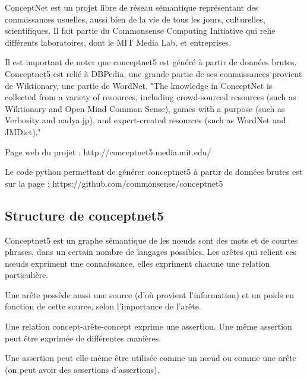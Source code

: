 \documentclass[a4paper,12pt]{article}
\begin{document}
ConceptNet est un projet libre de réseau sémantique représentant des connaissances usuelles, aussi bien de la vie de tous les jours, culturelles, scientifiques. Il fait partie du Commonsense Computing Initiative qui relie différents laboratoires, dont le MIT Media Lab, et entreprises.

Il est important de noter que conceptnet5 est généré à partir de données brutes. Conceptnet5 est relié à DBPedia, une grande partie de ses connaissances provient de Wiktionary, une partie de WordNet.
"The knowledge in ConceptNet is collected from a variety of resources, including crowd-sourced resources (such as Wiktionary and Open Mind Common Sense), games with a purpose (such as Verbosity and nadya.jp), and expert-created resources (such as WordNet and JMDict)."

Page web du projet :
http://conceptnet5.media.mit.edu/

Le code python permettant de générer conceptnet5 à partir de données brutes est sur la page :
https://github.com/commonsense/conceptnet5

\subsection{Structure de conceptnet5}

Conceptnet5 est un graphe sémantique de 
les n\oe uds sont des mots et de courtes phrases, dans un certain nombre de langages possibles. Les arêtes qui relient ces n\oe uds expriment une connaissance, elles expriment chacune une relation particulière.

Une arête possède aussi une source (d'où provient l'information) et un poids en fonction de cette source, selon l'importance de l'arête.

Une relation concept-arête-concept exprime une assertion. Une même assertion peut être exprimée de différentes manières.

Une assertion peut elle-même être utilisée comme un n\oe ud ou comme une arête (on peut avoir des assertions d'assertions).
\end{document}
